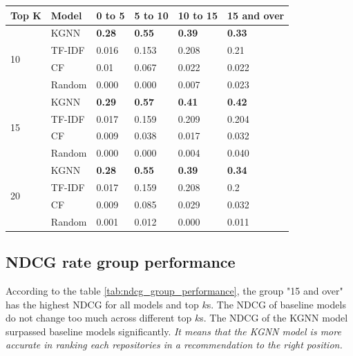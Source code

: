 \documentclass[11pt,twoside]{report}
\begin{document}
\begin{center}
    \begin{tabular}{l | l | l | l | l | l}
    \hline
    Top K & Model & 0 to 5 & 5 to 10 & 10 to 15 & 15 and over \\
    \hline
    \multirow{4}{*}{10} 
    & KGNN & \textbf{0.28} & \textbf{0.55} & \textbf{0.39} & \textbf{0.33} \\
    & TF-IDF & 0.016 & 0.153 & 0.208 & 0.21 \\
    & CF & 0.01 & 0.067 & 0.022 & 0.022 \\
    & Random & 0.000 & 0.000 & 0.007 & 0.023 \\
    \hline
    \multirow{4}{*}{15}
    & KGNN & \textbf{0.29} & \textbf{0.57} & \textbf{0.41} & \textbf{0.42} \\
    & TF-IDF & 0.017 & 0.159 & 0.209 & 0.204 \\
    & CF & 0.009 & 0.038 & 0.017 & 0.032 \\
    & Random & 0.000 & 0.000 & 0.004 & 0.040 \\
    \hline
    \multirow{4}{*}{20}
    & KGNN & \textbf{0.28} & \textbf{0.55} & \textbf{0.39} & \textbf{0.34} \\
    & TF-IDF & 0.017 & 0.159 & 0.208 & 0.2 \\
    & CF & 0.009 & 0.085 & 0.029 & 0.032 \\
    & Random & 0.001 & 0.012 & 0.000 & 0.011 \\
    \end{tabular}
    \label{tab:mrr_group_performance}
\end{center}

\subsection{NDCG rate group performance}
According to the table \ref{tab:ndcg_group_performance}, the group "15 and over" has the highest NDCG for all models and top $k$s. The NDCG of baseline models do not change too much across different top $k$s. The NDCG of the KGNN model surpassed baseline models significantly. \textit{It means that the KGNN model is more accurate in ranking each repositories in a recommendation to the right position.}
\end{document}
